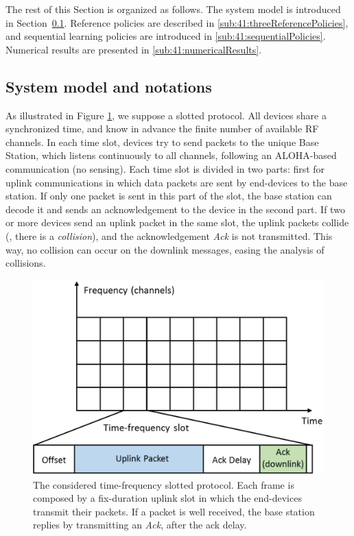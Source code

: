 The rest of this Section is organized as follows. The system model is introduced in Section~\ref{sub:41:systemModel}. Reference policies are described in \ref{sub:41:threeReferencePolicies}, and sequential learning policies are introduced in \ref{sub:41:sequentialPolicies}.
Numerical results are presented in \ref{sub:41:numericalResults}.


\subsection{System model and notations}\label{sub:41:systemModel}

As illustrated in Figure \ref{fig:41:protocol}, we suppose a slotted protocol.
All devices share a synchronized time, and know in advance the finite number of available RF channels.
In each time slot, devices try to send packets to the unique Base Station, which listens continuously to all channels, following an ALOHA-based communication (no sensing).
Each time slot is divided in two parts: first for uplink communications in which data packets are sent by end-devices to the base station. If only one packet is sent in this part of the slot, the base station can decode it and sends an acknowledgement to the device in the second part.
If two or more devices send an uplink packet in the same slot, the uplink packets collide (\ie, there is a \emph{collision}), and the acknowledgement \emph{Ack} is not transmitted.
This way, no collision can occur on the downlink messages, easing the analysis of collisions.

\begin{figure}[!t]
    \centering
    \includegraphics[scale=0.28]{2-Chapters/4-Chapter/CrownCom_17.git/protocol.eps}
    \caption{The considered time-frequency slotted protocol. Each frame is composed by a fix-duration uplink slot in which the end-devices transmit their packets. If a packet is well received, the base station replies by transmitting an \emph{Ack}, after the ack delay.}
    \label{fig:41:protocol}
\end{figure}

